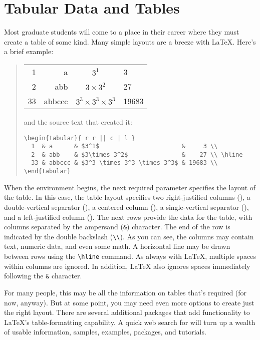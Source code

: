 \chapter{Tabular Data and Tables}

Most graduate students will come to a place in their career where they
must create a table of some kind.  Many simple layouts are a breeze
with \LaTeX.  Here's a brief example:

\begin{quote}
\begin{tabular}{ r r || c | l }
  1  & a      & $3^1$                      &     3 \\
  2  & abb    & $3\times 3^2$              &    27 \\ \hline
  33 & abbccc & $3^3 \times 3^3 \times 3^3$ & 19683 \\
\end{tabular}
\hskip12pt and the source text that created it:
\begin{verbatim}
\begin{tabular}{ r r || c | l }
  1  & a      & $3^1$                       &     3 \\
  2  & abb    & $3\times 3^2$               &    27 \\ \hline
  33 & abbccc & $3^3 \times 3^3 \times 3^3$ & 19683 \\
\end{tabular}
\end{verbatim}
\end{quote}

When the  environment begins, the next required parameter
specifies the layout of the table.  In this case, the table layout
specifies two right-justified columns (), a double-vertical
separator (\lit{||}), a centered column (), a single-vertical
separator (\lit{|}), and a left-justified column ().  The next
rows provide the data for the table, with columns separated by the
ampersand (\verb|&|) character.  The end of the row is indicated by
the double backslash (\verb|\\|).  As you can see, the columns may
contain text, numeric data, and even some math.  A horizontal line may
be drawn between rows using the \verb|\hline| command.  As always with
\LaTeX, multiple spaces within columns are ignored.  In addition,
\LaTeX{} also ignores spaces immediately following the \verb|&| character.

For many people, this may be all the information on tables that's
required (for now, anyway).  But at some point, you may need even more
options to create just the right layout.  There are several additional
packages that add functionality to \LaTeX's table-formatting
capability.  A quick web search for  will turn up a
wealth of usable information, samples, examples, packages, and
tutorials.

